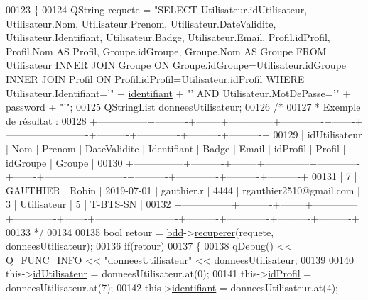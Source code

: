 \begin{DoxyCode}
00123 \{
00124     QString requete = \textcolor{stringliteral}{"SELECT Utilisateur.idUtilisateur, Utilisateur.Nom, Utilisateur.Prenom,
       Utilisateur.DateValidite, Utilisateur.Identifiant, Utilisateur.Badge, Utilisateur.Email, Profil.idProfil, Profil.Nom AS
       Profil, Groupe.idGroupe, Groupe.Nom AS Groupe FROM Utilisateur INNER JOIN Groupe ON
       Groupe.idGroupe=Utilisateur.idGroupe INNER JOIN Profil ON Profil.idProfil=Utilisateur.idProfil WHERE Utilisateur.Identifiant='"} + 
      \hyperlink{class_utilisateur_a1e79e47202a2c716346f47adbbeb2511}{identifiant} + \textcolor{stringliteral}{"' AND Utilisateur.MotDePasse='"} + password + \textcolor{stringliteral}{"'"};
00125     QStringList donneesUtilisateur;
00126     \textcolor{comment}{/*}
00127 \textcolor{comment}{     * Exemple de résultat :}
00128 \textcolor{comment}{
      +---------------+----------+--------+--------------+-------------+-------+-------------------------+----------+-------------+----------+----------+}
00129 \textcolor{comment}{| idUtilisateur | Nom      | Prenom | DateValidite | Identifiant | Badge | Email                   |
       idProfil | Profil      | idGroupe | Groupe   |}
00130 \textcolor{comment}{
      +---------------+----------+--------+--------------+-------------+-------+-------------------------+----------+-------------+----------+----------+}
00131 \textcolor{comment}{|             7 | GAUTHIER | Robin  | 2019-07-01   | gauthier.r  | 4444  | rgauthier2510@gmail.com |       
       3 | Utilisateur |        5 | T-BTS-SN |}
00132 \textcolor{comment}{
      +---------------+----------+--------+--------------+-------------+-------+-------------------------+----------+-------------+----------+----------+}
00133 \textcolor{comment}{     */}
00134 
00135     \textcolor{keywordtype}{bool} retour = \hyperlink{class_utilisateur_a94fa14e95bd90358fb67eca0170e1724}{bdd}->\hyperlink{class_base_de_donnees_a77539baad389f5acf754cd2cd452403e}{recuperer}(requete, donneesUtilisateur);
00136     \textcolor{keywordflow}{if}(retour)
00137     \{
00138         qDebug() << Q\_FUNC\_INFO << \textcolor{stringliteral}{"donneesUtilisateur"} << donneesUtilisateur;
00139 
00140         this->\hyperlink{class_utilisateur_ae1763e7a52c82c63506bc4160cdabb20}{idUtilisateur} = donneesUtilisateur.at(0);
00141         this->\hyperlink{class_utilisateur_a042947e8b86637d1eb012c3fc89a959e}{idProfil} = donneesUtilisateur.at(7);
00142         this->\hyperlink{class_utilisateur_a1e79e47202a2c716346f47adbbeb2511}{identifiant} = donneesUtilisateur.at(4);

\end{DoxyCode}
